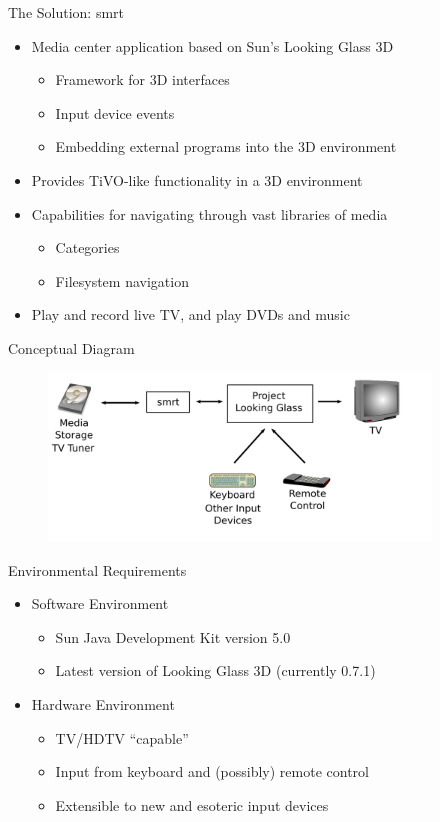 \documentclass[style=smrt,mode=present,paper=screen]{powerdot}
\begin{document}
\begin{slide}{The Solution: smrt}
\begin{itemize}
\item Media center application based on Sun's Looking Glass 3D
\begin{itemize}
	\item Framework for 3D interfaces
	\item Input device events
	\item Embedding external programs into the 3D environment
\end{itemize}
\item Provides TiVO-like functionality in a 3D environment
\item Capabilities for navigating through vast libraries of media
\begin{itemize}
	\item Categories
	\item Filesystem navigation
\end{itemize}
\item Play and record live TV, and play DVDs and music
\end{itemize}
\end{slide}

\begin{slide}{Conceptual Diagram}
\begin{figure}[htb]
	\includegraphics[width=4in]{../lib/figures/conceptual_overview}
\end{figure}
\end{slide}

\begin{slide}{Environmental Requirements}
\begin{itemize}
\item Software Environment
\begin{itemize}
	\item Sun Java Development Kit version 5.0
	\item Latest version of Looking Glass 3D (currently 0.7.1)
\end{itemize}
\item Hardware Environment
\begin{itemize}
	\item TV/HDTV ``capable''
	\item Input from keyboard and (possibly) remote control
	\item Extensible to new and esoteric input devices
\end{itemize}
\end{itemize}
\end{slide}
\end{document}
